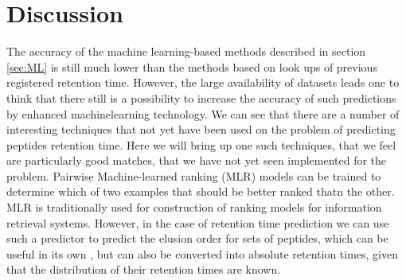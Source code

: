 \documentclass[a4paper]{article}
\begin{document}





\section{Discussion}

The accuracy of the machine learning-based methods described in
section \ref{sec:ML} is still much lower than the methods based on
look ups of previous registered retention time. However, the large
availability of datasets leads one to think that there still is a
possibility to increase the accuracy of such predictions by enhanced
machinelearning technology.  We can see that there are a number of
interesting techniques that not yet have been used on the problem of
predicting peptides retention time. Here we will bring up one such
techniques, that we feel are particularly good matches, that we have
not yet seen implemented for the problem. Pairwise Machine-learned
ranking (MLR) \cite{liu2009learning} models can be trained to
determine which of two examples that should be better ranked thatn the
other. MLR is traditionally used for construction of ranking models
for information retrieval systems. However, in the case of retention
time prediction we can use such a predictor to predict the elusion
order for sets of peptides, which can be useful in its own
\cite{bailey2012instant}, but can also be converted into absolute
retention times, given that the distribution of their retention times
are known.
\end{document}
